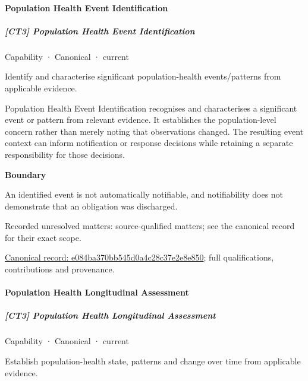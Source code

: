 \paragraph{Population Health Event Identification}

\subparagraph{[CT3] Population Health Event Identification}

\label{element:e084ba370bb545d0a4c28c37e2e8e850}
{\small Capability · Canonical · current}\par

Identify and characterise significant population-health events/patterns from applicable evidence.



Population Health Event Identification recognises and characterises a significant event or pattern from relevant evidence. It establishes the population-level concern rather than merely noting that observations changed. The resulting event context can inform notification or response decisions while retaining a separate responsibility for those decisions.



\textbf{Boundary}



An identified event is not automatically notifiable, and notifiability does not demonstrate that an obligation was discharged.


{\small Recorded unresolved matters: source-qualified matters; see the canonical record for their exact scope.}\par
{\footnotesize \href{../../../../continuum/strategy/capability/e084ba370bb545d0a4c28c37e2e8e850.md}{Canonical record: e084ba370bb545d0a4c28c37e2e8e850}; full qualifications, contributions and provenance.}\par
\paragraph{Population Health Longitudinal Assessment}

\subparagraph{[CT3] Population Health Longitudinal Assessment}

\label{element:4d52b8acda504329a595be27a736e63c}
{\small Capability · Canonical · current}\par

Establish population-health state, patterns and change over time from applicable evidence.



